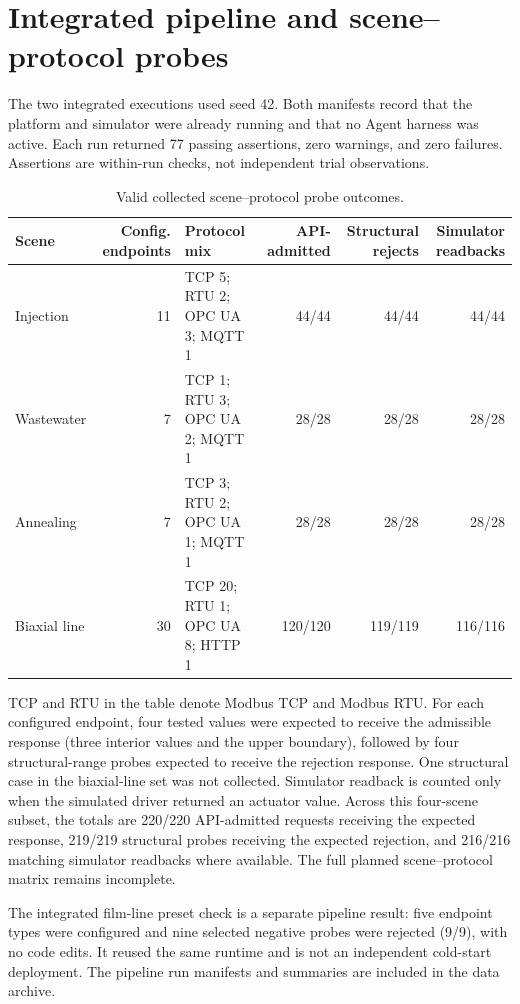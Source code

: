 \documentclass[10pt]{article}
\begin{document}
\section*{Integrated pipeline and scene--protocol probes}
The two integrated executions used seed 42. Both manifests record that the platform and simulator were already running and that no Agent harness was active. Each run returned 77 passing assertions, zero warnings, and zero failures. Assertions are within-run checks, not independent trial observations.

\begin{table}[htbp]
\centering
\caption{Valid collected scene--protocol probe outcomes.}
\scriptsize
\setlength{\tabcolsep}{1.5pt}
\begin{tabularx}{\textwidth}{@{}>{\raggedright\arraybackslash}p{2.0cm}r >{\raggedright\arraybackslash}X r r r@{}}
\toprule
Scene & Config. endpoints & Protocol mix & API-admitted & Structural rejects & Simulator readbacks \\
\midrule
Injection & 11 & TCP 5; RTU 2; OPC UA 3; MQTT 1 & 44/44 & 44/44 & 44/44 \\
Wastewater & 7 & TCP 1; RTU 3; OPC UA 2; MQTT 1 & 28/28 & 28/28 & 28/28 \\
Annealing & 7 & TCP 3; RTU 2; OPC UA 1; MQTT 1 & 28/28 & 28/28 & 28/28 \\
Biaxial line & 30 & TCP 20; RTU 1; OPC UA 8; HTTP 1 & 120/120 & 119/119 & 116/116 \\
\bottomrule
\end{tabularx}
\end{table}

TCP and RTU in the table denote Modbus TCP and Modbus RTU. For each configured endpoint, four tested values were expected to receive the admissible response (three interior values and the upper boundary), followed by four structural-range probes expected to receive the rejection response. One structural case in the biaxial-line set was not collected. Simulator readback is counted only when the simulated driver returned an actuator value. Across this four-scene subset, the totals are 220/220 API-admitted requests receiving the expected response, 219/219 structural probes receiving the expected rejection, and 216/216 matching simulator readbacks where available. The full planned scene--protocol matrix remains incomplete.

The integrated film-line preset check is a separate pipeline result: five endpoint types were configured and nine selected negative probes were rejected (9/9), with no code edits. It reused the same runtime and is not an independent cold-start deployment. The pipeline run manifests and summaries are included in the data archive.
\end{document}
